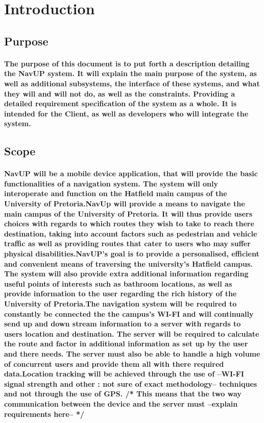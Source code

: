 \documentclass{article}
\begin{document}
	\newpage
	
	\section{Introduction}
    	
        \subsection{Purpose}
        	\paragraph{The purpose of this document is to put forth a description detailing the NavUP system. It will explain the main purpose of the system, as well as additional subsystems, the interface of these systems, and what they will and will not do, as well as the constraints. Providing a detailed requirement specification of the system as a whole. It is intended for the Client, as well as developers who will integrate the system.}
    	\subsection{Scope}
        	\paragraph{NavUP will be a mobile device application, that will provide the basic functionalities of a navigation system. The system will only interoperate and function on the Hatfield main campus of the University of Pretoria.NavUp will provide a means to navigate the main campus of the University of Pretoria. It will thus provide users choices with regards to which routes they wish to take to reach there destination, taking into account factors such as pedestrian and vehicle traffic as well as providing routes that cater to users who may suffer physical disabilities.NavUP's goal is to provide a personalised, efficient and convenient means of traversing the university's Hatfield campus. The system will also provide extra additional information regarding useful points of interests such as bathroom locations, as well as provide information to the user regarding the rich history of the University of Pretoria.The navigation system will be required to constantly be connected the the campus's WI-FI and will continually send up and down stream information to a server with regards to users location and destination. The server will be required to calculate the route and factor in additional information as set up by the user and there needs. The server must also be able to handle a high volume of concurrent users and provide them all with there required data.Location tracking will be achieved through the use of --WI-FI signal strength and other : not sure of exact methodology-- techniques and not through the use of GPS. /* This means that the two way communication between the device and the server must --explain requirements here-- */ }
\end{document}
